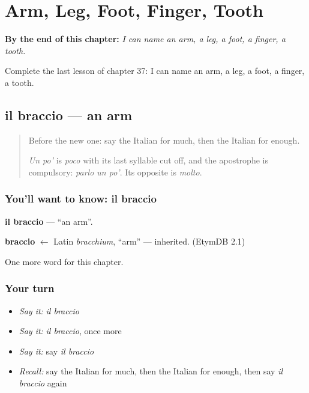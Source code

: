 
\chapter{Arm, Leg, Foot, Finger, Tooth}
\label{ch:it-arm-leg-foot-finger-tooth}

\begin{chapteropening}
\textbf{By the end of this chapter:} \emph{I can name an arm, a leg, a foot, a finger, a tooth.}

Complete the last lesson of chapter 37: I can name an arm, a leg, a foot, a finger, a tooth.
\end{chapteropening}

\section[il braccio]{il braccio — an arm}

\label{lesson:IT-C37-braccio}



\begin{quote}
Before the new one: say the Italian for much, then the Italian for enough.

\emph{Un po'} is \emph{poco} with its last syllable cut off, and the apostrophe is compulsory: \emph{parlo un po'}. Its opposite is \emph{molto}.
\end{quote}

\subsection*{You'll want to know: il braccio}
\textbf{il braccio} — \textquotedblleft{}an arm\textquotedblright{}.

\begin{cousinweb}
\textbf{braccio} $\leftarrow$ Latin \emph{bracchium}, \textquotedblleft{}arm\textquotedblright{} — inherited. (EtymDB 2.1)
\end{cousinweb}

\begin{grammarlens}[title={What you've built}]
One more word for this chapter.
\end{grammarlens}

\subsection*{Your turn}
\begin{itemize}
\raggedright
  \item \emph{Say it:} \emph{il braccio}
  \item \emph{Say it:} \emph{il braccio}, once more
  \item \emph{Say it:} say \emph{il braccio}
  \item \emph{Recall:} say the Italian for much, then the Italian for enough, then say \emph{il braccio} again
\end{itemize}

